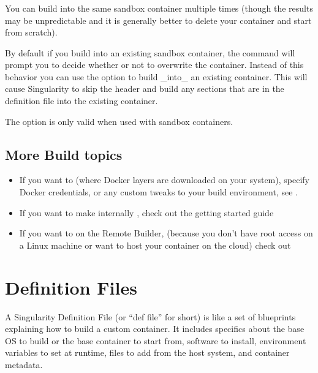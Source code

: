 \documentclass[letterpaper,10pt,english]{sphinxmanual}
\begin{document}
\subsection{}
\label{\detokenize{build_a_container:update}}
You can build into the same sandbox container multiple times (though the results
may be unpredictable and it is generally better to delete your container and
start from scratch).

By default if you build into an existing sandbox container, the  
command will prompt you to decide whether or not to overwrite the container.
Instead of this behavior you can use the  option to build \_into\_ an
existing container. This will cause Singularity to skip the header and build
any sections that are in the definition file into the existing container.

The  option is only valid when used with sandbox containers.


\section{More Build topics}
\label{\detokenize{build_a_container:more-build-topics}}\begin{itemize}
\item {} 
If you want to  (where Docker layers are
downloaded on your system), specify Docker credentials, or any custom tweaks
to your build environment, see .

\item {} 
If you want to make internally , check out the getting
started guide 

\item {} 
If you want to  on the Remote Builder, (because you
don’t have root access on a Linux machine or want to host your container on
the cloud) check out 

\end{itemize}


\chapter{Definition Files}
\label{\detokenize{definition_files:definition-files}}\label{\detokenize{definition_files:id1}}\label{\detokenize{definition_files::doc}}\label{\detokenize{definition_files:sec-deffiles}}
A Singularity Definition File (or “def file” for short) is like a set of
blueprints explaining how to build a custom container. It includes specifics
about the base OS to build or the base container to start from, software to
install, environment variables to set at runtime, files to add from the host
system, and container metadata.
\end{document}
